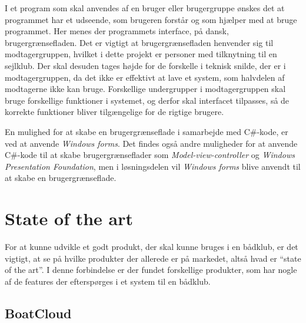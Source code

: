 I et program som skal anvendes af en bruger eller brugergruppe ønskes det at programmet har et udseende, som brugeren
forstår og som hjælper med at bruge programmet. Her menes der programmets interface, på dansk, brugergrænsefladen. Det
er vigtigt at brugergrænsefladen henvender sig til modtagergruppen, hvilket i dette projekt er personer med tilknytning
til en sejlklub. Der skal desuden tages højde for de forskelle i teknisk snilde, der er i modtagergruppen, da det ikke er
effektivt at lave et system, som halvdelen af modtagerne ikke kan bruge. Forskellige undergrupper i modtagergruppen skal
bruge forskellige funktioner i systemet, og derfor skal interfacet tilpasses, så de korrekte funktioner bliver
tilgængelige for de rigtige brugere.


En mulighed for at skabe en brugergrænseflade i samarbejde med C\#-kode, er ved at anvende \textit{Windows forms}.
Det findes også andre muligheder for at anvende C\#-kode til at skabe brugergrænseflader som
\textit{Model-view-controller} og \textit{Windows Presentation Foundation}, men i løsningsdelen vil \textit{Windows
forms} blive anvendt til at skabe en brugergrænseflade.  


\section{State of the art}

For at kunne udvikle et godt produkt, der skal kunne bruges i en bådklub, er det vigtigt, at se på hvilke
produkter der allerede er på markedet, altså hvad er ``state of the art''. I denne forbindelse er der fundet
forskellige produkter, som har nogle af de features der efterspørges i et system til en bådklub. 



\subsection*{BoatCloud}

